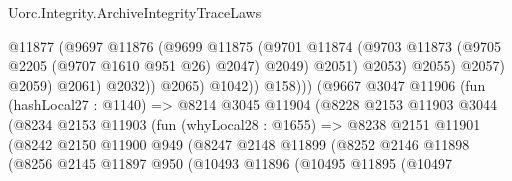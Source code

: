 \begin{lexlean}{Uorc.Integrity.ArchiveIntegrityTraceLaws}
\begin{coremodule}
                                            @11877
                                            (@9697
                                              @11876
                                              (@9699
                                                @11875
                                                (@9701
                                                  @11874
                                                  (@9703
                                                    @11873
                                                    (@9705 @2205 (@9707 @1610 @951 @26) @2047)
                                                    @2049)
                                                  @2051)
                                                @2053)
                                              @2055)
                                            @2057)
                                          @2059)
                                        @2061)
                                      @2032))
                                  @2065)
                                @1042))
                            @158)))
                      (@9667
                        @3047
                        @11906
                        (fun (hashLocal27 : @1140) =>
                        @8214
                          @3045
                          @11904
                          (@8228
                            @2153
                            @11903
                            @3044
                            (@8234
                              @2153
                              @11903
                              (fun (whyLocal28 : @1655) =>
                              @8238
                                @2151
                                @11901
                                (@8242
                                  @2150
                                  @11900
                                  @949
                                  (@8247
                                    @2148
                                    @11899
                                    (@8252
                                      @2146
                                      @11898
                                      (@8256
                                        @2145
                                        @11897
                                        @950
                                        (@10493
                                          @11896
                                          (@10495
                                            @11895
                                            (@10497

\end{coremodule}
\end{lexlean}
